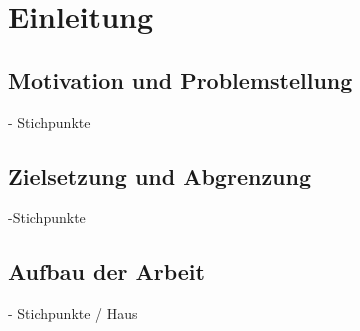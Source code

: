 \chapter{Einleitung}

\section{Motivation und Problemstellung}


- Stichpunkte
\newpage
\section{Zielsetzung und Abgrenzung}

-Stichpunkte

\newpage
\section{Aufbau der Arbeit}

- Stichpunkte / Haus

\newpage